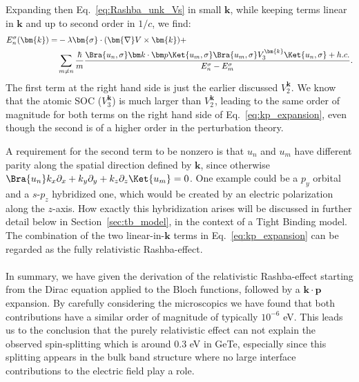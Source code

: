 Expanding then Eq.~\eqref{eq:Rashba_unk_Vs} in small $\bm{k}$, while keeping terms linear in $\bm{k}$ and up to second order in $1/c$, we find:
\begin{align}
	\label{eq:kp_expansion}
	E_n^{\sigma}(\bm{k}) =& -\lambda \bm{\sigma} \cdot ( \bm{\nabla}V \times \bm{k}) + \\
		& \sum_{m \neq n}\frac{\hbar}{m}\frac{\Bra{u_n,\sigma} \bm k \cdot \bm p \Ket{u_m, \sigma}\Bra{u_m, \sigma} V_3^{\bm{k}} \Ket{u_n, \sigma} + h.c.}{E_n^{\sigma} - E_m^{\sigma}}.\nonumber
\end{align}
The first term at the right hand side is just the earlier discussed $V^{\bm k}_2$.
We know that the atomic SOC ($V^{\bm k}_3$) is much larger than $V^{\bm{k}}_2$, leading to the same order of magnitude for both terms on the right hand side of Eq.~\eqref{eq:kp_expansion}, even though the second is of a higher order in the perturbation theory.

A requirement for the second term to be nonzero is that $u_n$ and $u_m$ have different parity along the spatial direction defined by $\bm{k}$, since otherwise $\Bra{u_n} k_x \partial_x + k_y \partial_y + k_z \partial_z \Ket{u_m} = 0$.
One example could be a $p_y$ orbital and a $s$-$p_z$ hybridized one, which would be created by an electric polarization along the $z$-axis.
How exactly this hybridization arises will be discussed in further detail below in Section~\ref{sec:tb_model}, in the context of a Tight Binding model.
The combination of the two linear-in-$\bm{k}$ terms in Eq.~\eqref{eq:kp_expansion} can be regarded as the fully relativistic Rashba-effect.
\\\\
In summary, we have given the derivation of the relativistic Rashba-effect starting from the Dirac equation applied to the Bloch functions, followed by a $\bm k \cdot \bm p$ expansion.
By carefully considering the microscopics we have found that both contributions have a similar order of magnitude of typically $10^{-6}$ eV.
This leads us to the conclusion that the purely relativistic effect can not explain the observed spin-splitting which is around 0.3 eV in GeTe, especially since this splitting appears in the bulk band structure where no large interface contributions to the electric field play a role.

